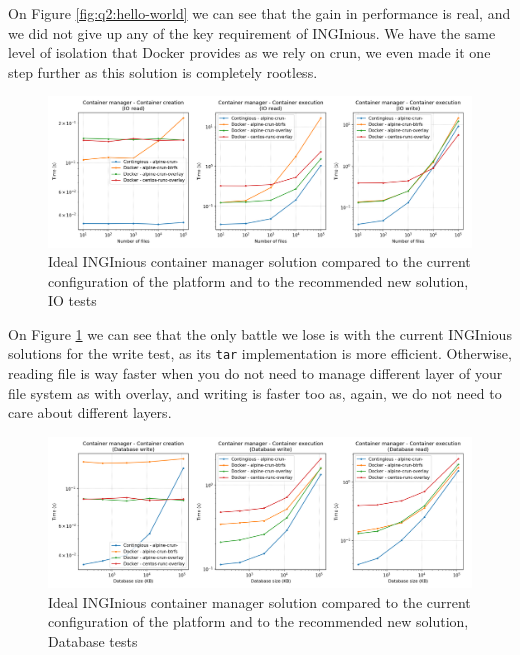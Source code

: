 On Figure \ref{fig:q2:hello-world} we can see that the gain in performance is real, and we did not give up any of the key requirement of INGInious.  We have the same level of isolation that Docker provides as we rely on crun, we even made it one step further as this solution is completely rootless.

\begin{figure}[h!]
  \begin{center}
    \includegraphics[width=\linewidth]{images/question-2-io.png}
    \caption{Ideal INGInious container manager solution compared to the current configuration of the platform and to the recommended new solution, IO tests}
    \label{fig:q2:io}
  \end{center}
\end{figure}

On Figure \ref{fig:q2:io} we can see that the only battle we lose is with the current INGInious solutions for the write test, as its \texttt{tar} implementation is more efficient.  Otherwise, reading file is way faster when you do not need to manage different layer of your file system as with overlay, and writing is faster too as, again, we do not need to care about different layers.

\begin{figure}[h!]
  \begin{center}
    \includegraphics[width=\linewidth]{images/question-2-db.png}
    \caption{Ideal INGInious container manager solution compared to the current configuration of the platform and to the recommended new solution, Database tests}
    \label{fig:q2:db}
  \end{center}
\end{figure}

